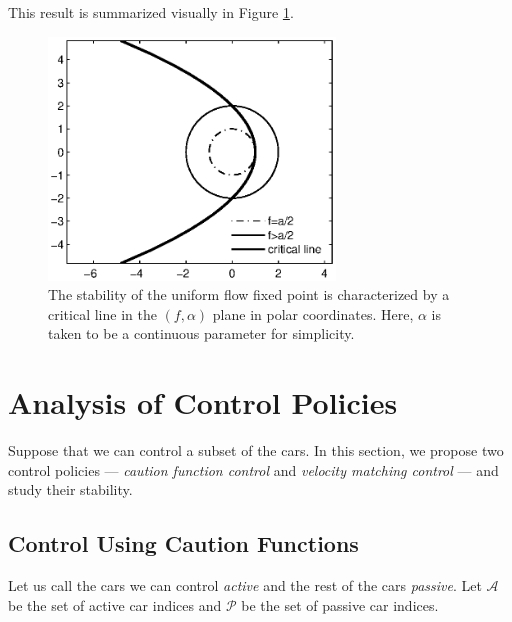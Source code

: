 \documentclass[10pt,twocolumn]{article}
\theoremstyle{ss}
\newcommand{\lm}{\fontfamily{\sfdefault}\selectfont}
\begin{document}
This result is summarized visually in Figure \ref{fig:stblregion}.

\begin{figure}[!h]
\lm
\begin{center}
\includegraphics[width=3in]{stblregion}
\end{center}
\caption{ \label{fig:stblregion} The stability of the uniform flow fixed point is characterized by a critical line in the $(f,\alpha)$ plane in polar coordinates. Here, $\alpha$ is taken to be a continuous parameter for simplicity.}
\end{figure}

\section{Analysis of Control Policies}
Suppose that we can control a subset of the cars. In this section, we propose two control policies --- {\em caution function control} and {\em velocity matching control} --- and study their stability.

\subsection{Control Using Caution Functions}
Let us call the cars we can control {\em active} and the rest of the cars {\em passive}. Let $\mathcal{A}$ be the set of active car indices and $\mathcal{P}$ be the set of passive car indices. 
\end{document}
